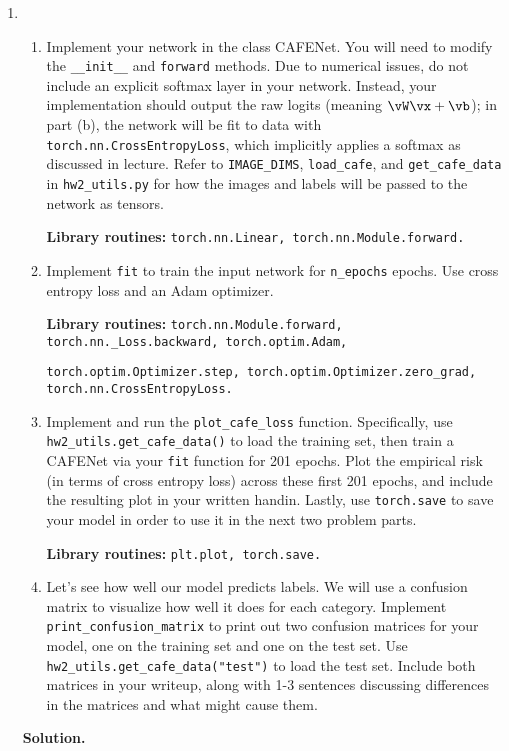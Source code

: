 \documentclass{article}
\theoremstyle{definition}
\theoremstyle{remark}
\newenvironment{Q}
{%
\clearpage
\item
}
{%
\phantom{s}%
\bigskip%
\noindent\textbf{Solution.}
}
\begin{document}
\begin{enumerate}[font={\Large\bfseries},left=0pt]
\begin{Q}
    \begin{enumerate}
        \item Implement your network in the class CAFENet.  You
            will need to modify the \texttt{\_\_init\_\_} and \texttt{forward} methods. Due to numerical issues, do not include an explicit softmax layer in your network. Instead, your implementation should output the raw logits (meaning $\vW \vx + \vb$); in part (b), the network will be fit to data with \texttt{torch.nn.CrossEntropyLoss}, which implicitly applies a softmax as discussed in lecture. Refer to \texttt{IMAGE\_DIMS}, \texttt{load\_cafe}, and \texttt{get\_cafe\_data} in \texttt{hw2\_utils.py} for how the images and labels will be passed to the network as tensors.
            
            \textbf{Library routines:} \texttt{torch.nn.Linear, torch.nn.Module.forward.}
            
        \item Implement \texttt{fit} to train the input network for \texttt{n\_epochs} epochs. Use cross entropy loss and an Adam optimizer.
        
        \textbf{Library routines:} \texttt{torch.nn.Module.forward, torch.nn.\_Loss.backward, torch.optim.Adam,}
        
        \texttt{torch.optim.Optimizer.step, torch.optim.Optimizer.zero\_grad, torch.nn.CrossEntropyLoss.}
        
        \item Implement and run the \texttt{plot\_cafe\_loss} function.
          Specifically, 
          use \texttt{hw2\_utils.get\_cafe\_data()} to load the training set,
          then train a CAFENet via your \texttt{fit} function for 201 epochs.
          Plot the empirical risk (in terms of cross entropy loss) across these first 201 epochs,
          and include the resulting plot in your written handin.
          Lastly, use \texttt{torch.save} to save your model in order to use it in the next two problem parts.
            
        \textbf{Library routines:} \texttt{plt.plot, torch.save.}

        \item Let's see how well our model predicts labels.
            We will use a confusion matrix to visualize how well it does for each category.
            Implement \texttt{print\_confusion\_matrix} to print out two confusion matrices for your model,
            one on the training set and one on the test set.
            Use \texttt{hw2\_utils.get\_cafe\_data("test")} to load the test set.
            Include both matrices in your writeup,
            along with 1-3 sentences discussing differences in the matrices and what
            might cause them.
            

\end{enumerate}
\end{Q}
\end{enumerate}
\end{document}
